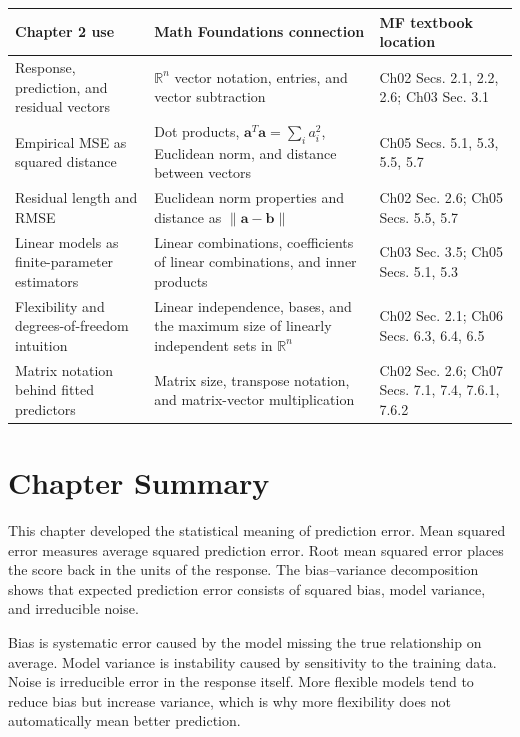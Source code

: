 {\begin{center}
\begin{tabular}{|p{}|p{}|p{}|}
\hline
\textbf{Chapter 2 use} & \textbf{Math Foundations connection} & \textbf{MF textbook location} \\
\hline
Response, prediction, and residual vectors & $\mathbb{R}^n$ vector notation, entries, and vector subtraction & Ch02 Secs. 2.1, 2.2, 2.6; Ch03 Sec. 3.1 \\
\hline
Empirical MSE as squared distance & Dot products, $\mathbf{a}^T\mathbf{a}=\sum_i a_i^2$, Euclidean norm, and distance between vectors & Ch05 Secs. 5.1, 5.3, 5.5, 5.7 \\
\hline
Residual length and RMSE & Euclidean norm properties and distance as $\|\mathbf{a}-\mathbf{b}\|$ & Ch02 Sec. 2.6; Ch05 Secs. 5.5, 5.7 \\
\hline
Linear models as finite-parameter estimators & Linear combinations, coefficients of linear combinations, and inner products & Ch03 Sec. 3.5; Ch05 Secs. 5.1, 5.3 \\
\hline
Flexibility and degrees-of-freedom intuition & Linear independence, bases, and the maximum size of linearly independent sets in $\mathbb{R}^n$ & Ch02 Sec. 2.1; Ch06 Secs. 6.3, 6.4, 6.5 \\
\hline
Matrix notation behind fitted predictors & Matrix size, transpose notation, and matrix-vector multiplication & Ch02 Sec. 2.6; Ch07 Secs. 7.1, 7.4, 7.6.1, 7.6.2 \\
\hline
\end{tabular}
\end{center}

\section{Chapter Summary}

This chapter developed the statistical meaning of prediction error.  Mean squared error measures average squared prediction error.  Root mean squared error places the score back in the units of the response.  The bias--variance decomposition shows that expected prediction error consists of squared bias, model variance, and irreducible noise.

Bias is systematic error caused by the model missing the true relationship on average.  Model variance is instability caused by sensitivity to the training data.  Noise is irreducible error in the response itself.  More flexible models tend to reduce bias but increase variance, which is why more flexibility does not automatically mean better prediction.

}
